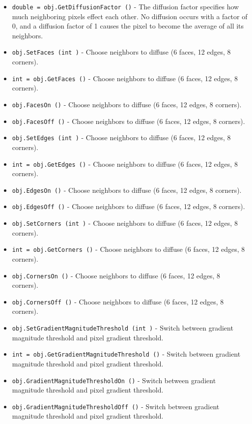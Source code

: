 \begin{itemize}
\item  \verb|double = obj.GetDiffusionFactor ()| -  The diffusion factor specifies  how much neighboring pixels effect each other.
 No diffusion occurs with a factor of 0, and a diffusion factor of 1 causes
 the pixel to become the average of all its neighbors.

\item  \verb|obj.SetFaces (int )| -  Choose neighbors to diffuse (6 faces, 12 edges, 8 corners).

\item  \verb|int = obj.GetFaces ()| -  Choose neighbors to diffuse (6 faces, 12 edges, 8 corners).

\item  \verb|obj.FacesOn ()| -  Choose neighbors to diffuse (6 faces, 12 edges, 8 corners).

\item  \verb|obj.FacesOff ()| -  Choose neighbors to diffuse (6 faces, 12 edges, 8 corners).

\item  \verb|obj.SetEdges (int )| -  Choose neighbors to diffuse (6 faces, 12 edges, 8 corners).

\item  \verb|int = obj.GetEdges ()| -  Choose neighbors to diffuse (6 faces, 12 edges, 8 corners).

\item  \verb|obj.EdgesOn ()| -  Choose neighbors to diffuse (6 faces, 12 edges, 8 corners).

\item  \verb|obj.EdgesOff ()| -  Choose neighbors to diffuse (6 faces, 12 edges, 8 corners).

\item  \verb|obj.SetCorners (int )| -  Choose neighbors to diffuse (6 faces, 12 edges, 8 corners).

\item  \verb|int = obj.GetCorners ()| -  Choose neighbors to diffuse (6 faces, 12 edges, 8 corners).

\item  \verb|obj.CornersOn ()| -  Choose neighbors to diffuse (6 faces, 12 edges, 8 corners).

\item  \verb|obj.CornersOff ()| -  Choose neighbors to diffuse (6 faces, 12 edges, 8 corners).

\item  \verb|obj.SetGradientMagnitudeThreshold (int )| -  Switch between gradient magnitude threshold and pixel gradient threshold.

\item  \verb|int = obj.GetGradientMagnitudeThreshold ()| -  Switch between gradient magnitude threshold and pixel gradient threshold.

\item  \verb|obj.GradientMagnitudeThresholdOn ()| -  Switch between gradient magnitude threshold and pixel gradient threshold.

\item  \verb|obj.GradientMagnitudeThresholdOff ()| -  Switch between gradient magnitude threshold and pixel gradient threshold.

\end{itemize}
